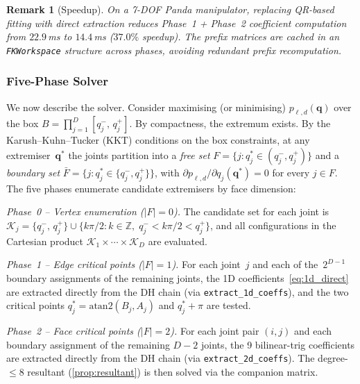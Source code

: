 \documentclass[journal]{IEEEtran}
\newtheorem{remark}{Remark}
\begin{document}
\begin{remark}[Speedup]
On a 7-DOF Panda manipulator, replacing QR-based fitting with direct
extraction reduces Phase~1 + Phase~2 coefficient computation from
$22.9$\,ms to $14.4$\,ms ($37.0\%$ speedup).
The prefix matrices are cached in an \texttt{FKWorkspace} structure
across phases, avoiding redundant prefix recomputation.
\end{remark}


\subsubsection{Five-Phase Solver}\label{sec:five_phase}

We now describe the solver.
Consider maximising (or minimising) $p_{\ell,d}(\bm{q})$ over the box
$B = \prod_{j=1}^{D} [q_j^-,\, q_j^+]$.
By compactness, the extremum exists.
By the Karush--Kuhn--Tucker (KKT) conditions on the box constraints,
at any extremiser~$\bm{q}^*$ the joints partition into
a \emph{free set}
$F = \{j : q_j^* \in (q_j^-,q_j^+)\}$ and a
\emph{boundary set} $\bar F = \{j : q_j^* \in \{q_j^-,q_j^+\}\}$,
with $\partial p_{\ell,d}/\partial q_j(\bm{q}^*) = 0$ for every
$j \in F$.
The five phases enumerate candidate extremisers by face dimension:

\emph{Phase~0 -- Vertex enumeration ($|F|=0$).}
The candidate set for each joint is
$\mathcal{K}_j = \{q_j^-,\, q_j^+\}
\cup \{ k\pi/2 : k\in \mathbb{Z},\;
q_j^- < k\pi/2 < q_j^+ \}$,
and all configurations in the Cartesian product
$\mathcal{K}_1 \times \cdots \times \mathcal{K}_D$ are evaluated.

\emph{Phase~1 -- Edge critical points ($|F|=1$).}
For each joint~$j$ and each of the~$2^{D-1}$ boundary
assignments of the remaining joints,
the 1D coefficients~\eqref{eq:1d_direct} are extracted directly
from the DH chain (via \texttt{extract\_1d\_coeffs}),
and the two critical points
$q_j^* = \mathrm{atan2}(B_j,A_j)$ and $q_j^*+\pi$ are tested.

\emph{Phase~2 -- Face critical points ($|F|=2$).}
For each joint pair $(i,j)$ and each boundary assignment of the
remaining $D{-}2$ joints, the 9 bilinear-trig coefficients
are extracted directly from the DH chain
(via \texttt{extract\_2d\_coeffs}).
The degree-$\leq 8$ resultant (\cref{prop:resultant}) is then
solved via the companion matrix.
\end{document}
